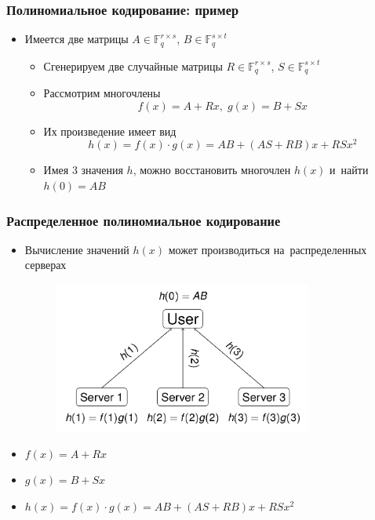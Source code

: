 \documentclass{beamer}
\begin{document}
    \begin{frame}
        \frametitle{Полиномиальное кодирование: пример}
        \begin{itemize}
            \item Имеется две матрицы $A \in \mathbb{F}_q^{r\times s}$, $B \in \mathbb{F}_q^{s\times t}$
            \begin{itemize}
                \item<1-> Сгенерируем две случайные матрицы $R \in \mathbb{F}_q^{r\times s}$, $S \in \mathbb{F}_q^{s\times t}$
                \item<2-> Рассмотрим многочлены
                \begin{equation*}
                    f(x) = A + Rx, \; g(x) = B + Sx
                \end{equation*}
                \item<3-> Их произведение имеет вид
                \begin{equation*}
                    h(x) = f(x) \cdot g(x) = AB + \left(AS + RB\right)x + RSx^2
                \end{equation*}
                \item<4-> Имея 3 значения $h$, можно восстановить многочлен $h(x)$ и~найти $h(0) = AB$
            \end{itemize}
        \end{itemize}
    \end{frame}

    \begin{frame}

        \frametitle{Распределенное полиномиальное кодирование}
        \begin{itemize}
            \item Вычисление значений $h(x)$ может производиться на~распределенных серверах
            \begin{figure}[t!]
                \includegraphics[width=0.8\textwidth]{poly_code.png}
            \end{figure}
            \item $f(x) = A + Rx$
            \item $g(x) = B + Sx$
            \item $h(x) = f(x) \cdot g(x) = AB + \left(AS + RB\right)x + RSx^2$
        \end{itemize}
        
    \end{frame}
\end{document}
